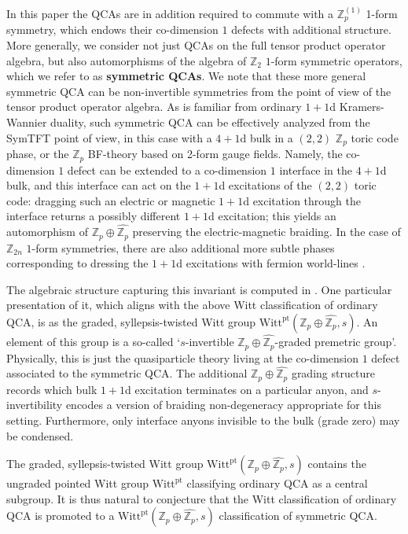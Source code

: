 \documentclass[aps,twocolumn,prx,floatfix,preprintnumbers, nofootinbib,10pt]{revtex4-2}
\numberwithin{equation}{section}
\theoremstyle{definition}
\theoremstyle{remark}
\theoremstyle{claim}
\newcommand{\Z}{{\mathbb Z}}
\newcommand{\Witt}{\text{Witt}}
\newcommand{\pt}{\text{pt}}
\begin{document}
In this paper the QCAs are in addition required to commute with a $\Z_p^{(1)}$ 1-form symmetry, which endows their co-dimension $1$ defects with additional structure.  More generally, we consider not just QCAs on the full tensor product operator algebra, but also automorphisms of the algebra of $\Z_2$ $1$-form symmetric operators, which we refer to as {\bf symmetric QCAs}.  We note that these more general symmetric QCA can be non-invertible symmetries from the point of view of the tensor product operator algebra. 
As is familiar from ordinary $1+1$d Kramers-Wannier duality, such symmetric QCA can be effectively analyzed from the SymTFT point of view, in this case with a $4+1$d bulk in a $(2,2)$ $\Z_p$ toric code phase, or the $\Z_p$ BF-theory based on 2-form gauge fields.  Namely, the co-dimension $1$ defect can be extended to a co-dimension $1$ interface in the $4+1$d bulk, and this interface can act on the $1+1$d  excitations of the $(2,2)$ toric code: dragging such an electric or magnetic $1+1$d excitation through the interface returns a possibly different $1+1$d excitation; this yields an automorphism of $\Z_p\oplus\widehat{\Z_p}$ preserving the electric-magnetic braiding.  In the case of $\Z_{2n}$ $1$-form symmetries, there are also additional more subtle phases corresponding to dressing the $1+1$d excitations with fermion world-lines \cite{Chen:2023Loops}.

The algebraic structure capturing this invariant is computed in \cite{Bhardwaj:2024xcx}.  One particular presentation of it, which aligns with the above Witt classification of ordinary QCA, is as the graded, syllepsis-twisted Witt group $\Witt^\pt(\Z_p\oplus\widehat{\Z_p},s)$.  An element of this group is a so-called `$s$-invertible $\Z_p\oplus\widehat{\Z_p}$-graded premetric group'.  
Physically, this is just the quasiparticle theory living at the co-dimension $1$ defect associated to the symmetric QCA. 
The additional $\Z_p\oplus\widehat{\Z_p}$ grading structure records which bulk $1+1$d excitation terminates on a particular anyon, and $s$-invertibility encodes a version of braiding non-degeneracy appropriate for this setting.  
Furthermore, only interface anyons invisible to the bulk (grade zero) may be condensed.

The graded, syllepsis-twisted Witt group $\Witt^\pt(\Z_p\oplus\widehat{\Z_p},s)$ contains the ungraded pointed Witt group $\Witt^\pt$ classifying ordinary QCA as a central subgroup.  It is thus natural to conjecture that the Witt classification of ordinary QCA is promoted to a $\Witt^\pt(\Z_p\oplus\widehat{\Z_p},s)$ classification of symmetric QCA.  
\end{document}
